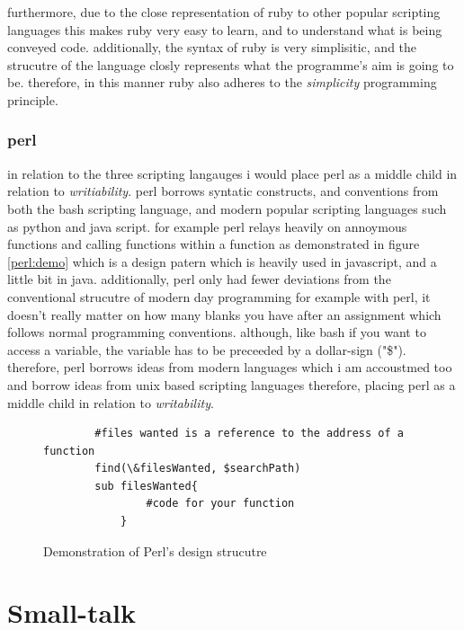 \documentclass[
	12pt, %
]{fphw}
\begin{document}
furthermore, due to the close representation of ruby to other popular scripting
languages this makes ruby very easy to learn, and to understand what is being
conveyed code. additionally, the syntax of ruby is very simplisitic, and the
strucutre of the language closly represents what the programme's aim  is  going
to be. therefore, in this manner ruby also adheres to the \emph{simplicity}
programming principle.

\subsubsection{perl} in relation to the three scripting langauges i would place
perl as a middle child in relation to \emph{writiability}. perl borrows syntatic
constructs, and conventions from both the bash scripting language, and modern
popular scripting languages such as python and java script. for example perl
relays heavily on annoymous functions and calling functions within a function
as demonstrated in figure \ref{perl:demo} which is a design
patern which is heavily used in javascript, and a little bit in java. additionally,
perl only had fewer deviations from the conventional strucutre of modern day programming
for example with perl, it doesn't really matter on how many blanks you have after
an assignment which follows normal programming conventions. although, like bash
if you want to access a variable, the variable has to be preceeded by a dollar-sign
("\$"). therefore, perl borrows ideas from modern languages which i am accoustmed too
and borrow ideas from unix based scripting languages therefore, placing perl as
a middle child in relation to \emph{writability}.

\begin{figure}[!htp]
    \begin{problem}
        \begin{verbatim}
        #files wanted is a reference to the address of a function
        find(\&filesWanted, $searchPath)
        sub filesWanted{
                #code for your function
            }
        \end{verbatim}
    \end{problem}
    \caption{Demonstration of Perl's design strucutre}
    \label{Perl:demo}
\end{figure}

\section{Small-talk}
\end{document}
